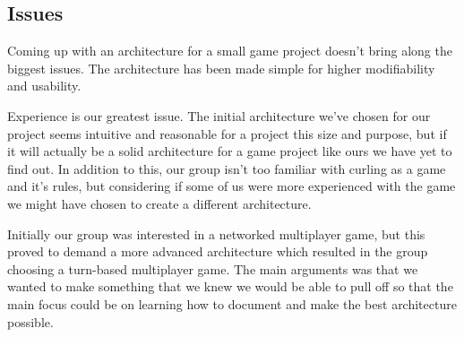 \subsection{Issues}

Coming up with an architecture for a small game project doesn’t bring along the biggest issues. The architecture has been made simple for higher modifiability and usability. 

Experience is our greatest issue. The initial architecture we’ve chosen for our project seems intuitive and reasonable for a project this size and purpose, but if it will actually be a solid architecture for a game project like ours we have yet to find out. In addition to this, our group isn’t too familiar with curling as a game and it’s rules, but considering if some of us were more experienced with the game we might have chosen to create a different architecture. 

Initially our group was interested in a networked multiplayer game, but this proved to demand a more advanced architecture which resulted in the group choosing a turn-based multiplayer game. The main arguments was that we wanted to make something that we knew we would be able to pull off so that the main focus could be on learning how to document and make the best architecture possible.